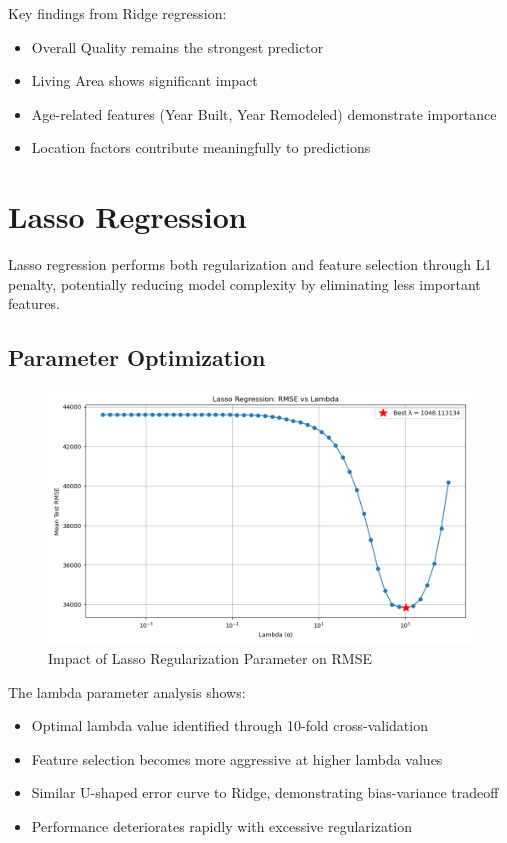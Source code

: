 \documentclass[12pt]{report}
\begin{document}
Key findings from Ridge regression:
\begin{itemize}
    \item Overall Quality remains the strongest predictor
    \item Living Area shows significant impact
    \item Age-related features (Year Built, Year Remodeled) demonstrate importance
    \item Location factors contribute meaningfully to predictions
\end{itemize}

\section{Lasso Regression}
Lasso regression performs both regularization and feature selection through L1 penalty, potentially reducing model complexity by eliminating less important features.

\subsection{Parameter Optimization}
\begin{figure}[H]
    \centering
    \includegraphics[width=1.0\textwidth]{figures/lasso_lambda_vs_rmse.png}
    \caption{Impact of Lasso Regularization Parameter on RMSE}
    \label{fig:lasso_lambda}
\end{figure}

The lambda parameter analysis shows:
\begin{itemize}
    \item Optimal lambda value identified through 10-fold cross-validation
    \item Feature selection becomes more aggressive at higher lambda values
    \item Similar U-shaped error curve to Ridge, demonstrating bias-variance tradeoff
    \item Performance deteriorates rapidly with excessive regularization
\end{itemize}
\end{document}
